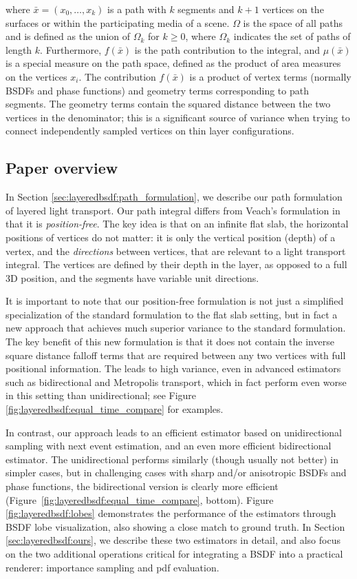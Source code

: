 where $\bar x = (x_0, \dots, x_k)$ is a path with $k$ segments and $k + 1$ vertices on the surfaces or within the participating media of a scene.
$\Omega$ is the space of all paths and is defined as the union of $\Omega_k$ for $k \geq 0$, where $\Omega_k$ indicates the set of paths of length $k$.
Furthermore, $f(\bar x)$ is the path contribution to the integral, and $\mu(\bar x)$ is a special measure on the path space, defined as the product of area measures on the vertices $x_i$. The contribution $f(\bar x)$ is a product of vertex terms (normally BSDFs and phase functions) and geometry terms corresponding to path segments. The geometry terms contain the squared distance between the two vertices in the denominator; this is a significant source of variance when trying to connect independently sampled vertices on thin layer configurations.

\subsection{Paper overview}

In Section \ref{sec:layeredbsdf:path_formulation}, we describe our path formulation of layered light transport. Our path integral differs from Veach's formulation in that it is \emph{position-free}. The key idea is that on an infinite flat slab, the horizontal positions of vertices do not matter: it is only the vertical position (depth) of a vertex, and the \emph{directions} between vertices, that are relevant to a light transport integral. The vertices are defined by their depth in the layer, as opposed to a full 3D position, and the segments have variable unit directions.

It is important to note that our position-free formulation is not just a simplified specialization of the standard formulation to the flat slab setting, but in fact a new approach that achieves much superior variance to the standard formulation. The key benefit of this new formulation is that it does not contain the inverse square distance falloff terms that are required between any two vertices with full positional information. The leads to high variance, even in advanced estimators such as bidirectional and Metropolis transport, which in fact perform even worse in this setting than unidirectional; see Figure \ref{fig:layeredbsdf:equal_time_compare} for examples.

In contrast, our approach leads to an efficient estimator based on unidirectional sampling with next event estimation, and an even more efficient bidirectional estimator. The unidirectional performs similarly (though usually not better) in simpler cases, but in challenging cases with sharp and/or anisotropic BSDFs and phase functions, the bidirectional version is clearly more efficient (Figure~\ref{fig:layeredbsdf:equal_time_compare}, bottom). 
Figure \ref{fig:layeredbsdf:lobes} demonstrates the performance of the estimators through BSDF lobe visualization, also showing a close match to ground truth. In Section \ref{sec:layeredbsdf:ours}, we describe these two estimators in detail, and also focus on the two additional operations critical for integrating a BSDF into a practical renderer: importance sampling and pdf evaluation.


